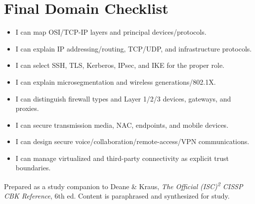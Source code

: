 \documentclass[10pt,letterpaper]{article}
\begin{document}
\section{Final Domain Checklist}
\begin{itemize}[label=\(\square\)]
\item I can map OSI/TCP-IP layers and principal devices/protocols.
\item I can explain IP addressing/routing, TCP/UDP, and infrastructure protocols.
\item I can select SSH, TLS, Kerberos, IPsec, and IKE for the proper role.
\item I can explain microsegmentation and wireless generations/802.1X.
\item I can distinguish firewall types and Layer 1/2/3 devices, gateways, and proxies.
\item I can secure transmission media, NAC, endpoints, and mobile devices.
\item I can design secure voice/collaboration/remote-access/VPN communications.
\item I can manage virtualized and third-party connectivity as explicit trust boundaries.
\end{itemize}
\vfill
{\footnotesize\color{Teal}Prepared as a study companion to Deane \& Kraus, \textit{The Official (ISC)\textsuperscript{2} CISSP CBK Reference}, 6th ed. Content is paraphrased and synthesized for study.}
\end{document}
